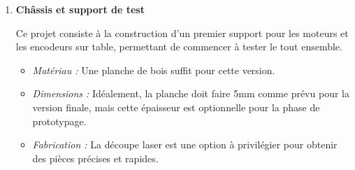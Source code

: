\documentclass[a4paper,10pt]{article}
\begin{document}
\begin{enumerate}
    \item \textbf{Châssis et support de test}

    Ce projet consiste à la construction d'un premier support pour les moteurs et les encodeurs sur table, permettant de commencer à tester le tout ensemble.

    \begin{itemize}
        \item \textit{Matériau :} Une planche de bois suffit pour cette version.
        \item \textit{Dimensions :} Idéalement, la planche doit faire 5mm comme prévu pour la version finale, mais cette épaisseur est optionnelle pour la phase de prototypage.
        \item \textit{Fabrication :} La découpe laser est une option à privilégier pour obtenir des pièces précises et rapides.
    \end{itemize}
\end{enumerate}
\end{document}

